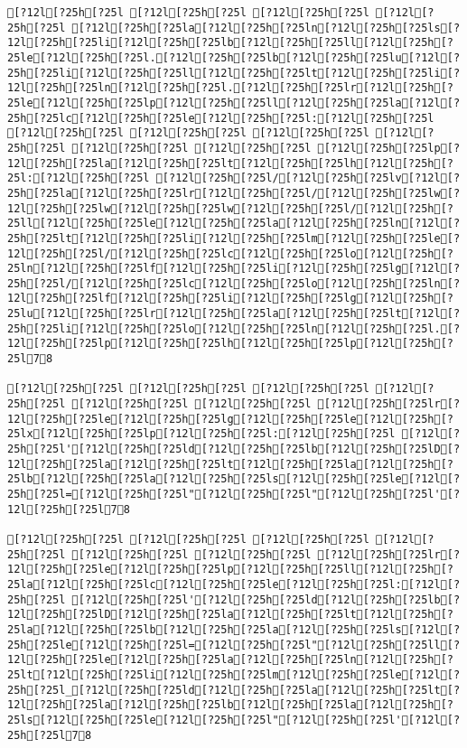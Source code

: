 \documentclass{scrartcl}
\begin{document}
\begin{Verbatim}
[?12l[?25h[?25l [?12l[?25h[?25l [?12l[?25h[?25l [?12l[?25h[?25l [?12l[?25h[?25la[?12l[?25h[?25ln[?12l[?25h[?25ls[?12l[?25h[?25li[?12l[?25h[?25lb[?12l[?25h[?25ll[?12l[?25h[?25le[?12l[?25h[?25l.[?12l[?25h[?25lb[?12l[?25h[?25lu[?12l[?25h[?25li[?12l[?25h[?25ll[?12l[?25h[?25lt[?12l[?25h[?25li[?12l[?25h[?25ln[?12l[?25h[?25l.[?12l[?25h[?25lr[?12l[?25h[?25le[?12l[?25h[?25lp[?12l[?25h[?25ll[?12l[?25h[?25la[?12l[?25h[?25lc[?12l[?25h[?25le[?12l[?25h[?25l:[?12l[?25h[?25l
[?12l[?25h[?25l [?12l[?25h[?25l [?12l[?25h[?25l [?12l[?25h[?25l [?12l[?25h[?25l [?12l[?25h[?25l [?12l[?25h[?25lp[?12l[?25h[?25la[?12l[?25h[?25lt[?12l[?25h[?25lh[?12l[?25h[?25l:[?12l[?25h[?25l [?12l[?25h[?25l/[?12l[?25h[?25lv[?12l[?25h[?25la[?12l[?25h[?25lr[?12l[?25h[?25l/[?12l[?25h[?25lw[?12l[?25h[?25lw[?12l[?25h[?25lw[?12l[?25h[?25l/[?12l[?25h[?25ll[?12l[?25h[?25le[?12l[?25h[?25la[?12l[?25h[?25ln[?12l[?25h[?25lt[?12l[?25h[?25li[?12l[?25h[?25lm[?12l[?25h[?25le[?12l[?25h[?25l/[?12l[?25h[?25lc[?12l[?25h[?25lo[?12l[?25h[?25ln[?12l[?25h[?25lf[?12l[?25h[?25li[?12l[?25h[?25lg[?12l[?25h[?25l/[?12l[?25h[?25lc[?12l[?25h[?25lo[?12l[?25h[?25ln[?12l[?25h[?25lf[?12l[?25h[?25li[?12l[?25h[?25lg[?12l[?25h[?25lu[?12l[?25h[?25lr[?12l[?25h[?25la[?12l[?25h[?25lt[?12l[?25h[?25li[?12l[?25h[?25lo[?12l[?25h[?25ln[?12l[?25h[?25l.[?12l[?25h[?25lp[?12l[?25h[?25lh[?12l[?25h[?25lp[?12l[?25h[?25l78

[?12l[?25h[?25l [?12l[?25h[?25l [?12l[?25h[?25l [?12l[?25h[?25l [?12l[?25h[?25l [?12l[?25h[?25l [?12l[?25h[?25lr[?12l[?25h[?25le[?12l[?25h[?25lg[?12l[?25h[?25le[?12l[?25h[?25lx[?12l[?25h[?25lp[?12l[?25h[?25l:[?12l[?25h[?25l [?12l[?25h[?25l'[?12l[?25h[?25ld[?12l[?25h[?25lb[?12l[?25h[?25lD[?12l[?25h[?25la[?12l[?25h[?25lt[?12l[?25h[?25la[?12l[?25h[?25lb[?12l[?25h[?25la[?12l[?25h[?25ls[?12l[?25h[?25le[?12l[?25h[?25l=[?12l[?25h[?25l"[?12l[?25h[?25l"[?12l[?25h[?25l'[?12l[?25h[?25l78

[?12l[?25h[?25l [?12l[?25h[?25l [?12l[?25h[?25l [?12l[?25h[?25l [?12l[?25h[?25l [?12l[?25h[?25l [?12l[?25h[?25lr[?12l[?25h[?25le[?12l[?25h[?25lp[?12l[?25h[?25ll[?12l[?25h[?25la[?12l[?25h[?25lc[?12l[?25h[?25le[?12l[?25h[?25l:[?12l[?25h[?25l [?12l[?25h[?25l'[?12l[?25h[?25ld[?12l[?25h[?25lb[?12l[?25h[?25lD[?12l[?25h[?25la[?12l[?25h[?25lt[?12l[?25h[?25la[?12l[?25h[?25lb[?12l[?25h[?25la[?12l[?25h[?25ls[?12l[?25h[?25le[?12l[?25h[?25l=[?12l[?25h[?25l"[?12l[?25h[?25ll[?12l[?25h[?25le[?12l[?25h[?25la[?12l[?25h[?25ln[?12l[?25h[?25lt[?12l[?25h[?25li[?12l[?25h[?25lm[?12l[?25h[?25le[?12l[?25h[?25l_[?12l[?25h[?25ld[?12l[?25h[?25la[?12l[?25h[?25lt[?12l[?25h[?25la[?12l[?25h[?25lb[?12l[?25h[?25la[?12l[?25h[?25ls[?12l[?25h[?25le[?12l[?25h[?25l"[?12l[?25h[?25l'[?12l[?25h[?25l78


\end{Verbatim}
\end{document}
